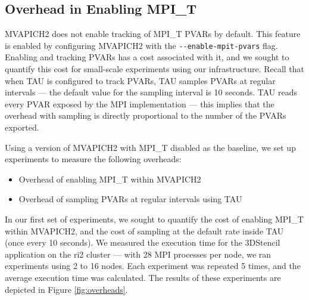\begin{table}[!htbp]
  \centering
  \small
  \captionsetup{justification=centering}
  \caption{MiniAMR: Impact of hardware offloading on application runtime}
  \label{tab:MiniAMR}
\end{table}

\subsection{Overhead in Enabling MPI\_T}
MVAPICH2 does not enable tracking of MPI\_T PVARs by default. This feature is enabled by configuring MVAPICH2 with the \verb+--enable-mpit-pvars+ flag. Enabling and tracking PVARs has a cost associated with it, and we sought to quantify this cost for small-scale experiments using our infrastructure. Recall that when TAU is configured to track PVARs, TAU samples PVARs at regular intervals --- the default value for the sampling interval is 10 seconds. TAU reads every PVAR exposed by the MPI implementation --- this implies that the overhead with sampling is directly proportional to the number of the PVARs exported. 
\par Using a version of MVAPICH2 with MPI\_T disabled as the baseline, we set up experiments to measure the following overheads:
\begin{itemize}
	\item Overhead of enabling MPI\_T within MVAPICH2
	\item Overhead of sampling PVARs at regular intervals using TAU
\end{itemize}
In our first set of experiments, we sought to quantify the cost of enabling MPI\_T within MVAPICH2, and the cost of sampling at the default rate inside TAU (once every 10 seconds). We measured the execution time for the 3DStencil application on the ri2 cluster --- with 28 MPI processes per node, we ran experiments using 2 to 16 nodes. Each experiment was repeated 5 times, and the average execution time was calculated. The results of these experiments are depicted in Figure \ref{fig:overheads}. 
